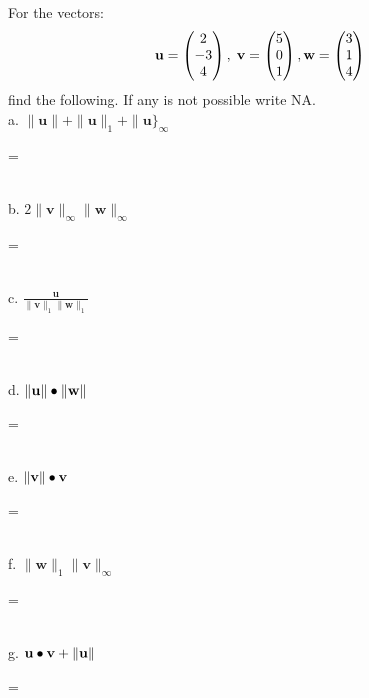 \documentclass{ximera}
\author{Parisa Fatheddin}
\begin{document}
\begin{exercise}


For the vectors:
\[\textbf{u}= \begin{pmatrix}
2\\
-3\\
4
\end{pmatrix}, \hspace{.1cm} \textbf{v} = \begin{pmatrix} 5\\ 0\\ 1 \end{pmatrix}, \\
\textbf{w} = \begin{pmatrix} 3 \\ 1 \\ 4 \end{pmatrix}\]
find the following. If any is not possible write NA.\\
a. $\|\textbf{u}\| + \|\textbf{u}\|_{1} + \|\textbf{u}\}_{\infty}$ \begin{prompt} = \end{prompt}\\

b. $2 \|\textbf{v}\|_{\infty} \|\textbf{w}\|_{\infty}$ \begin{prompt} =  \end{prompt}\\

c. $\frac{\textbf{u}}{\|\textbf{v}\|_{1} \|\textbf{w}\|_{1}}$ \begin{prompt} = \end{prompt} \\

d. $\|\textbf{u}\| \bullet \|\textbf{w}\|$ \begin{prompt} = \end{prompt} \\

e. $\|\textbf{v}\| \bullet \textbf{v}$ \begin{prompt} = \end{prompt}\\

f. $\|\textbf{w}\|_{1} \|\textbf{v}\|_{\infty}$ \begin{prompt} = \end{prompt}\\

g. $\textbf{u} \bullet \textbf{v} + \|\textbf{u}\|$ \begin{prompt} = \end{prompt}































\end{exercise}
\end{document}
